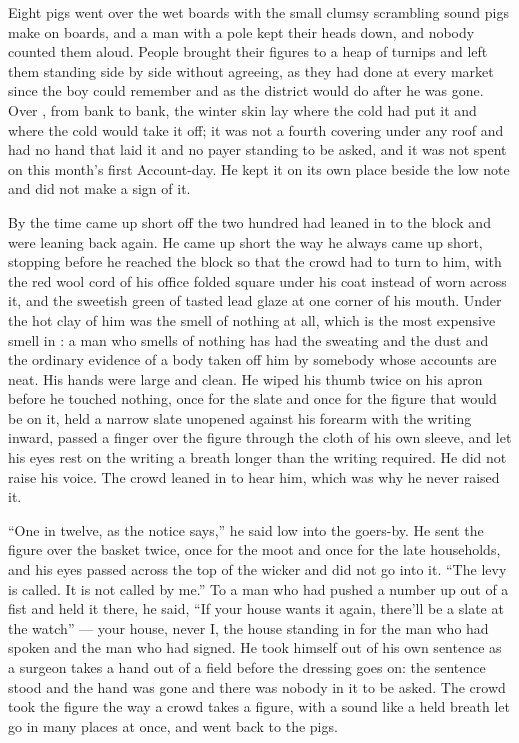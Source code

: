 Eight pigs went over the wet boards with the small clumsy scrambling sound pigs make on boards, and a man with a pole kept their heads down, and nobody counted them aloud. People brought their figures to a heap of turnips and left them standing side by side without agreeing, as they had done at every market since the boy could remember and as the district would do after he was gone. Over , from bank to bank, the winter skin lay where the cold had put it and where the cold would take it off; it was not a fourth covering under any roof and had no hand that laid it and no payer standing to be asked, and it was not spent on this month's first Account-day. He kept it on its own place beside the low note and did not make a sign of it.

\scenebreak

By the time  came up short off  the two hundred had leaned in to the block and were leaning back again. He came up short the way he always came up short, stopping before he reached the block so that the crowd had to turn to him, with the red wool cord of his office folded square under his coat instead of worn across it, and the sweetish green of tasted lead glaze at one corner of his mouth. Under the hot clay of him was the smell of nothing at all, which is the most expensive smell in : a man who smells of nothing has had the sweating and the dust and the ordinary evidence of a body taken off him by somebody whose accounts are neat. His hands were large and clean. He wiped his thumb twice on his apron before he touched nothing, once for the slate and once for the figure that would be on it, held a narrow slate unopened against his forearm with the writing inward, passed a finger over the figure through the cloth of his own sleeve, and let his eyes rest on the writing a breath longer than the writing required. He did not raise his voice. The crowd leaned in to hear him, which was why he never raised it.

“One in twelve, as the notice says,” he said low into the goers-by. He sent the figure over the basket twice, once for the moot and once for the late households, and his eyes passed across the top of the wicker and did not go into it. “The levy is called. It is not called by me.” To a man who had pushed a number up out of a fist and held it there, he said, “If your house wants it again, there'll be a slate at the watch” --- your house, never I, the house standing in for the man who had spoken and the man who had signed. He took himself out of his own sentence as a surgeon takes a hand out of a field before the dressing goes on: the sentence stood and the hand was gone and there was nobody in it to be asked. The crowd took the figure the way a crowd takes a figure, with a sound like a held breath let go in many places at once, and went back to the pigs.


